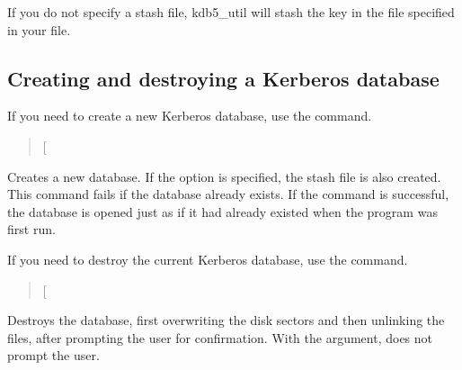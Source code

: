 \documentclass[letterpaper,10pt,english]{sphinxmanual}
\begin{document}
If you do not specify a stash file, kdb5\_util will stash the key in
the file specified in your {\hyperref[\detokenize{admin/conf_files/kdc_conf:kdc-conf-5}]{}} file.


\subsection{Creating and destroying a Kerberos database}
\label{\detokenize{admin/database:creating-and-destroying-a-kerberos-database}}
If you need to create a new Kerberos database, use the
{\hyperref[\detokenize{admin/admin_commands/kdb5_util:kdb5-util-8}]{}}  command.
\begin{quote}

 {[}\sphinxstylestrong{-s}{]}
\end{quote}

Creates a new database.  If the  option is specified, the stash
file is also created.  This command fails if the database already
exists.  If the command is successful, the database is opened just as
if it had already existed when the program was first run.

If you need to destroy the current Kerberos database, use the
{\hyperref[\detokenize{admin/admin_commands/kdb5_util:kdb5-util-8}]{}}  command.
\begin{quote}

 {[}\sphinxstylestrong{-f}{]}
\end{quote}

Destroys the database, first overwriting the disk sectors and then
unlinking the files, after prompting the user for confirmation.  With
the  argument, does not prompt the user.
\end{document}
